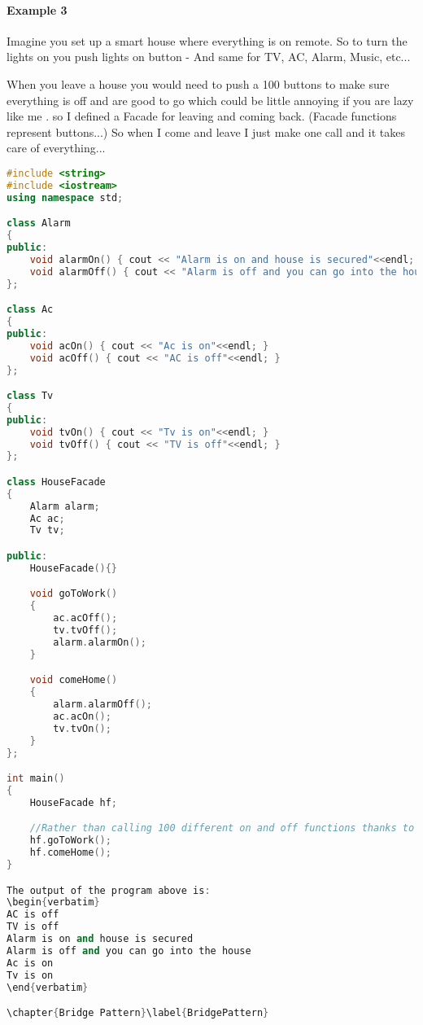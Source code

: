 \documentclass{book}
\begin{document}
\paragraph{Example 3}
Imagine you set up a smart house where everything is on remote. So to turn the lights on you push lights on button - And same for TV,
AC, Alarm, Music, etc...

When you leave a house you would need to push a 100 buttons to make sure everything is off and are good to go which could be little 
annoying if you are lazy like me .
so I defined a Facade for leaving and coming back. (Facade functions represent buttons...) So when I come and leave I just make one 
call and it takes care of everything...

\begin{lstlisting}[caption={Facade Pattern sample 3}, language=C++]
#include <string>
#include <iostream>
using namespace std;

class Alarm
{
public:
	void alarmOn() { cout << "Alarm is on and house is secured"<<endl; }
	void alarmOff() { cout << "Alarm is off and you can go into the house"<<endl; }
};

class Ac
{
public:
	void acOn() { cout << "Ac is on"<<endl; }
	void acOff() { cout << "AC is off"<<endl; }
};

class Tv
{
public:
	void tvOn() { cout << "Tv is on"<<endl; }
	void tvOff() { cout << "TV is off"<<endl; }
};

class HouseFacade
{
	Alarm alarm;
	Ac ac;
	Tv tv;

public:
	HouseFacade(){}

	void goToWork()
	{
		ac.acOff();
		tv.tvOff();
		alarm.alarmOn();
	}

	void comeHome()
	{
		alarm.alarmOff();
		ac.acOn();
		tv.tvOn();
	}
};

int main()
{
	HouseFacade hf;

	//Rather than calling 100 different on and off functions thanks to facade I only have 2 functions...
	hf.goToWork();
	hf.comeHome();
}

The output of the program above is:
\begin{verbatim}
AC is off
TV is off
Alarm is on and house is secured
Alarm is off and you can go into the house
Ac is on
Tv is on
\end{verbatim}

\chapter{Bridge Pattern}\label{BridgePattern}

\end{lstlisting}
\end{document}
